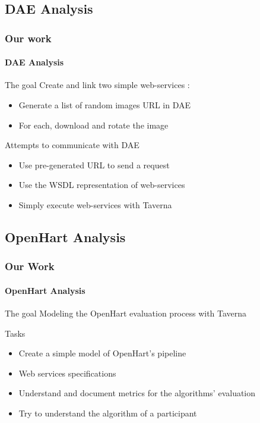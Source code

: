 \documentclass[c]{beamer}
\begin{document}
\subsection{DAE Analysis}
\begin{frame}

\frametitle{Our work}
\framesubtitle{DAE Analysis}
\begin{block}{The goal}
Create and link two simple web-services : 
\begin{itemize}
\item Generate a list of random images URL in DAE
\item For each, download and rotate the image
\end{itemize}
\end{block}
\begin{block}{Attempts to communicate with DAE}
\begin{itemize}
\item Use pre-generated URL to send a request
\item Use the WSDL representation of web-services
\item Simply execute web-services with Taverna
\end{itemize}
\end{block}
\end{frame}
\subsection{OpenHart Analysis}
\begin{frame}
\frametitle{Our Work}
\framesubtitle{OpenHart Analysis}
\begin{block}{The goal}
Modeling the OpenHart evaluation process with Taverna
\end{block}
\begin{block}{Tasks}
\begin{itemize}
\item Create a simple model of OpenHart's pipeline
\item Web services specifications
\item Understand and document metrics for the algorithms' evaluation
\item Try to understand the algorithm of a participant
\end{itemize}
\end{block}
\end{frame}
\end{document}
